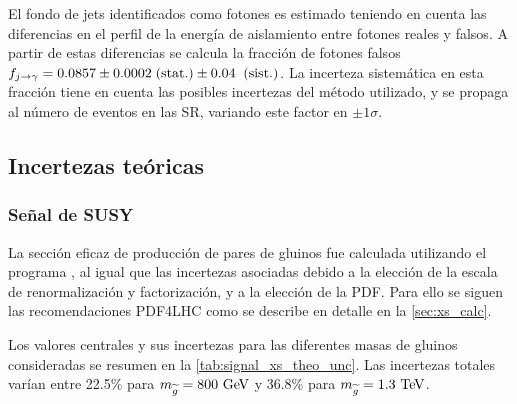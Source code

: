 El fondo de jets identificados como fotones es estimado teniendo en cuenta las
diferencias en el perfil de la energía de aislamiento entre fotones reales y falsos. A partir
de estas diferencias se calcula la fracción de fotones falsos $f_{j\rightarrow\gamma} = 0.0857 \pm 0.0002 \mbox{$\;$(stat.)} \pm 0.04 \;\mbox{$\;$(sist.)}$.
La incerteza sistemática en esta fracción tiene en cuenta las posibles incertezas
del método utilizado, y se propaga al número de eventos en las SR, variando
este factor en $\pm 1\sigma$.



\subsection{Incertezas teóricas}\label{sec:theosyst}


\subsubsection{Señal de SUSY}\label{sec:syst_signal}

La sección eficaz de producción de pares de gluinos fue calculada utilizando
el programa {\nllfast}, al igual que las incertezas asociadas debido a la elección
de la escala de renormalización y factorización, y a la elección de la PDF.
Para ello se siguen las recomendaciones PDF4LHC \cite{Botje:2011sn} como
se describe en detalle en la \cref{sec:xs_calc}.

Los valores centrales y sus incertezas para las diferentes masas de gluinos consideradas se resumen en
la \cref{tab:signal_xs_theo_unc}. Las incertezas totales varían entre 22.5\% para $m_{\gluino} = 800\GeV$
y 36.8\% para $m_{\gluino} = 1.3 \tev$.

